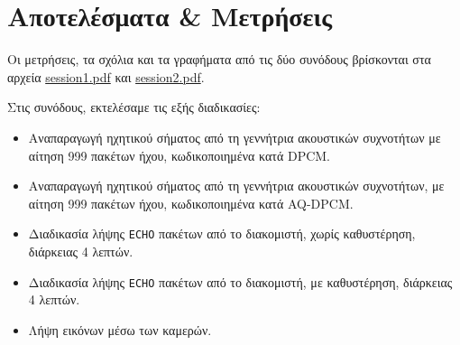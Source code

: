 \chapter{Αποτελέσματα \& Μετρήσεις}
Οι μετρήσεις, τα σχόλια και τα γραφήματα από τις δύο συνόδους βρίσκονται στα αρχεία \url{session1.pdf} και \url{session2.pdf}.

Στις συνόδους, εκτελέσαμε τις εξής διαδικασίες:
\begin{itemize}
\item Αναπαραγωγή ηχητικού σήματος από τη γεννήτρια ακουστικών συχνοτήτων
με αίτηση 999 πακέτων ήχου, κωδικοποιημένα κατά DPCM.
\item Αναπαραγωγή ηχητικού σήματος από τη γεννήτρια ακουστικών συχνοτήτων,
με αίτηση 999 πακέτων ήχου, κωδικοποιημένα κατά AQ-DPCM.
\item Διαδικασία λήψης \texttt{ECHO} πακέτων από το διακομιστή, χωρίς καθυστέρηση, διάρκειας 4 λεπτών.
\item Διαδικασία λήψης \texttt{ECHO} πακέτων από το διακομιστή, με καθυστέρηση, διάρκειας 4 λεπτών.
\item Λήψη εικόνων μέσω των καμερών.
\end{itemize}

